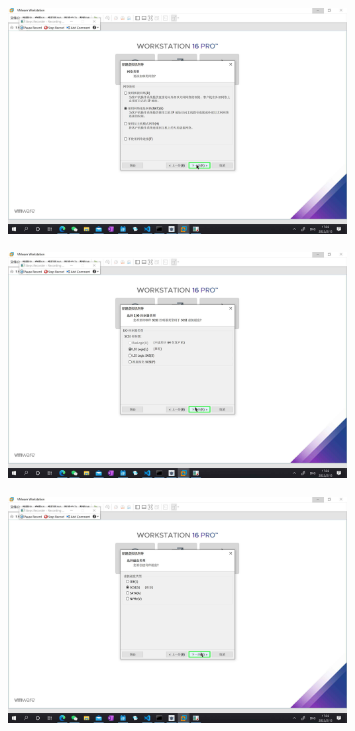\documentclass[UTF8]{ctexart}
\begin{document}
    \begin{figure}[H]
        \centering
        \includegraphics[width=0.8\textwidth]{assets/u12.png}
    \end{figure}
    \begin{figure}[H]
        \centering
        \includegraphics[width=0.8\textwidth]{assets/u13.png}
    \end{figure}
    \begin{figure}[H]
        \centering
        \includegraphics[width=0.8\textwidth]{assets/u14.png}
    \end{figure}
\end{document}
